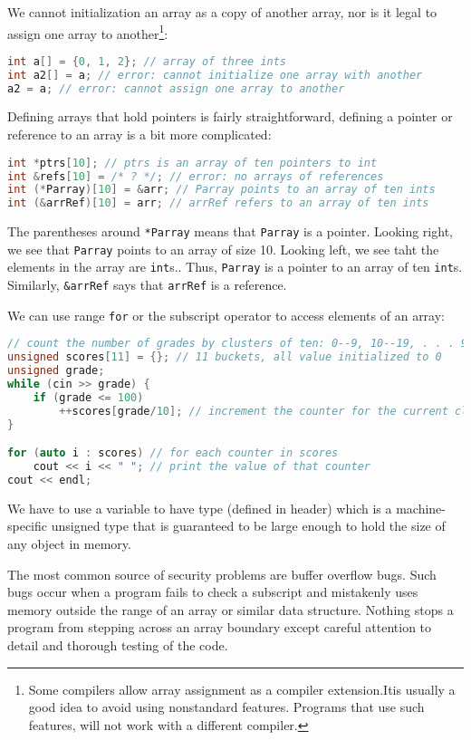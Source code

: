 We cannot initialization an array as a copy of another array, nor is it legal to assign one array to another\footnote{Some compilers allow array assignment as a compiler extension.Itis usually a good idea to avoid using nonstandard features. Programs that use such features, will not work with a different compiler.}:
\begin{lstlisting}[language=C++]
int a[] = {0, 1, 2}; // array of three ints 
int a2[] = a; // error: cannot initialize one array with another 
a2 = a; // error: cannot assign one array to another
\end{lstlisting}

Defining arrays that hold pointers is fairly straightforward, defining a pointer or reference to an array is a bit more complicated:
\begin{lstlisting}[language=C++]
int *ptrs[10]; // ptrs is an array of ten pointers to int 
int &refs[10] = /* ? */; // error: no arrays of references 
int (*Parray)[10] = &arr; // Parray points to an array of ten ints 
int (&arrRef)[10] = arr; // arrRef refers to an array of ten ints
\end{lstlisting}
The parentheses around \texttt{*Parray} means that \texttt{Parray} is a pointer. Looking right, we see that \texttt{Parray} points to an array of size 10. Looking left, we see taht the elements in the array are \texttt{int}s.. Thus, \texttt{Parray} is a pointer to an array of ten \texttt{int}s. Similarly, \texttt{\&arrRef} says that \texttt{arrRef} is a reference.

We can use range \texttt{for} or the subscript operator to access elements of an array:
\begin{lstlisting}[language=C++]
// count the number of grades by clusters of ten: 0--9, 10--19, . . . 90--99, 100 
unsigned scores[11] = {}; // 11 buckets, all value initialized to 0 
unsigned grade; 
while (cin >> grade) { 
    if (grade <= 100) 
        ++scores[grade/10]; // increment the counter for the current cluster 
}

for (auto i : scores) // for each counter in scores 
    cout << i << " "; // print the value of that counter 
cout << endl;
\end{lstlisting}
We have to use a variable to have type  (defined in  header) which is a machine-specific unsigned type that is guaranteed to be large enough to hold the size of any object in memory.

The most common source of security problems are buffer overflow bugs. Such bugs occur when a program fails to check a subscript and mistakenly uses memory outside the range of an array or similar data structure. Nothing stops a program from stepping across an array boundary except careful attention to detail and thorough testing of the code.

